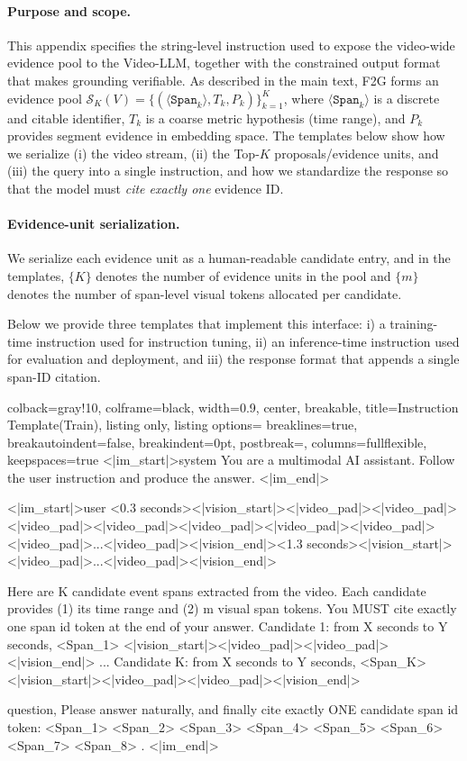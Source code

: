 \documentclass{article}
\theoremstyle{plain}
\theoremstyle{definition}
\theoremstyle{remark}
\begin{document}
\paragraph{Purpose and scope.}
This appendix specifies the string-level instruction used to expose the video-wide evidence pool to the Video-LLM, together with the constrained output format that makes grounding verifiable.
As described in the main text, F2G forms an evidence pool
$\mathcal{S}_K(V)=\{(\langle\texttt{Span}_k\rangle, T_k, P_k)\}_{k=1}^{K}$,
where $\langle\texttt{Span}_k\rangle$ is a discrete and citable identifier, $T_k$ is a coarse metric hypothesis (time range), and $P_k$ provides segment evidence in embedding space.
The templates below show how we serialize (i) the video stream, (ii) the Top-$K$ proposals/evidence units, and (iii) the query into a single instruction, and how we standardize the response so that the model must \emph{cite exactly one} evidence ID.

\paragraph{Evidence-unit serialization.}
We serialize each evidence unit as a human-readable candidate entry, and in the templates, $\{K\}$ denotes the number of evidence units in the pool and $\{m\}$ denotes the number of span-level visual tokens allocated per candidate.

Below we provide three templates that implement this interface:
i) a training-time instruction used for instruction tuning,
ii) an inference-time instruction used for evaluation and deployment,
and iii) the response format that appends a single span-ID citation.

\begin{tcblisting}{
  colback=gray!10,
  colframe=black,
  width=0.9\textwidth,
  center,
  breakable,
  title={Instruction Template(Train)},
  listing only,
  listing options={
    breaklines=true,
    breakautoindent=false,
    breakindent=0pt,
    postbreak=\mbox{},
    columns=fullflexible,
    keepspaces=true
  }
}
<|im_start|>system
You are a multimodal AI assistant. Follow the user instruction and produce the answer.
<|im_end|>

<|im_start|>user
<0.3 seconds><|vision_start|><|video_pad|><|video_pad|><|video_pad|><|video_pad|><|video_pad|><|video_pad|><|video_pad|><|video_pad|>...<|video_pad|><|vision_end|><1.3 seconds><|vision_start|><|video_pad|>...<|video_pad|><|vision_end|>

Here are {K} candidate event spans extracted from the video. Each candidate provides (1) its time range and (2) {m} visual span tokens. You MUST cite exactly one span id token at the end of your answer.
Candidate {1}: from X seconds to Y seconds, <Span_1> <|vision_start|><|video_pad|><|video_pad|><|vision_end|>
...
Candidate {K}: from X seconds to Y seconds, <Span_{K}> <|vision_start|><|video_pad|><|video_pad|><|vision_end|>

{question}, Please answer naturally, and finally cite exactly ONE candidate span id token: <Span_1> <Span_2> <Span_3> <Span_4> <Span_5> <Span_6> <Span_7> <Span_8> .
<|im_end|>
\end{tcblisting}
\end{document}
